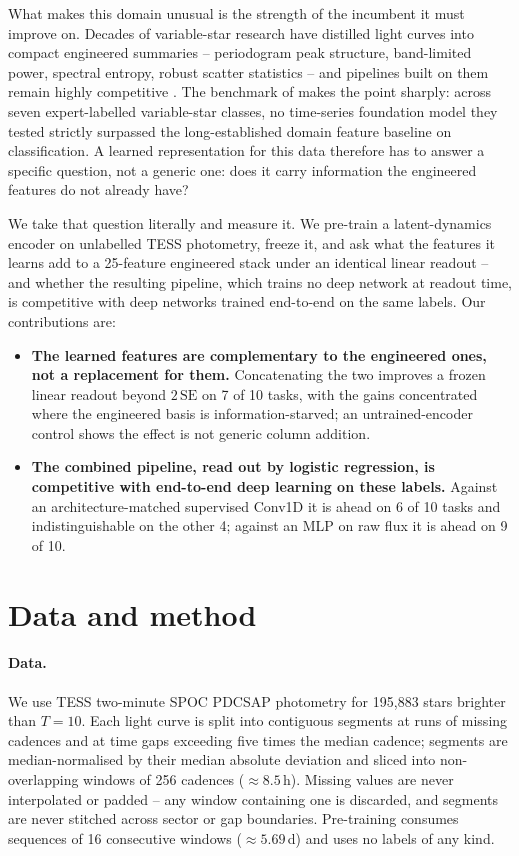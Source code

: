 \documentclass{article}
\begin{document}
What makes this domain unusual is the strength of the incumbent it must improve on. Decades of variable-star
research have distilled light curves into compact engineered summaries -- periodogram peak structure,
band-limited power, spectral entropy, robust scatter statistics -- and pipelines built on them remain
highly competitive \citep{audenaert2021}. The benchmark of \citet{li2025staremb} makes the point
sharply: across seven expert-labelled variable-star classes, no time-series foundation model they
tested strictly surpassed the long-established domain feature baseline on classification. A learned
representation for this data therefore has to answer a specific question, not a generic one: does it
carry information the engineered features do not already have?

We take that question literally and measure it. We pre-train a latent-dynamics encoder on unlabelled
TESS photometry, freeze it, and ask what the features it learns add to a 25-feature engineered stack under an
identical linear readout -- and whether the resulting pipeline, which trains no deep network at
readout time, is competitive with deep networks trained end-to-end on the same labels. Our
contributions are:

\begin{itemize}
\item \textbf{The learned features are complementary to the engineered ones, not a replacement for
them.} Concatenating the two improves a frozen linear readout beyond $2\,\mathrm{SE}$ on 7 of 10
tasks, with the gains concentrated where the engineered basis is information-starved; an
untrained-encoder control shows the effect is not generic column addition.
\item \textbf{The combined pipeline, read out by logistic regression, is competitive with end-to-end
deep learning on these labels.} Against an architecture-matched supervised Conv1D it is ahead on 6
of 10 tasks and indistinguishable on the other 4; against an MLP on raw flux it is ahead on 9 of 10.
\end{itemize}

\section{Data and method}

\paragraph{Data.} We use TESS two-minute SPOC PDCSAP photometry for 195{,}883 stars brighter than
$T = 10$. Each light curve is split into contiguous segments at runs of missing cadences and at time
gaps exceeding five times the median cadence; segments are median-normalised by their median absolute
deviation and sliced into non-overlapping windows of 256 cadences ($\approx 8.5$\,h). Missing values
are never interpolated or padded -- any window containing one is discarded, and segments are never
stitched across sector or gap boundaries. Pre-training consumes sequences of 16 consecutive windows
($\approx 5.69$\,d) and uses no labels of any kind.
\end{document}
